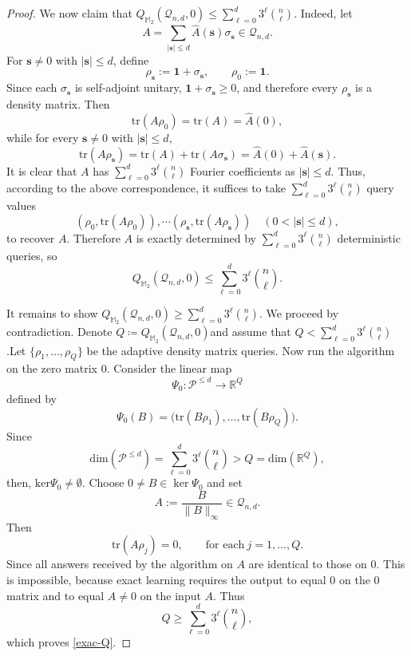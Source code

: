 \documentclass{amsbook}
\theoremstyle{definition}
\theoremstyle{remark}
\numberwithin{section}{chapter}
\numberwithin{equation}{chapter}
\newcommand{\M}{\mathbb{M}}
\newcommand{\1}{\mathbf{1}}
\newcommand{\s}{\mathbf{s}}
\begin{document}
\begin{proof}
We now claim that $Q_{\M_2}(\mathcal Q_{n,d},0)
\leq \sum_{\ell=0}^d 3^\ell \binom{n}{\ell}$. Indeed, let
	\[
	A=\sum_{|\s|\le d}\widehat A(\s)\sigma_{\s}\in \mathcal Q_{n,d}.
	\]	For $\s\neq 0$ with $|\s|\le d$, define
	\[
	\rho_{\s}:=\mathbf{1}+\sigma_{\s},
	\qquad
	\rho_0:=\mathbf{1}.
	\]
	Since each $\sigma_{\s}$ is  self-adjoint unitary, $\mathbf{1}+\sigma_{\s}\ge 0$, and therefore every
	$\rho_{\s}$ is a density matrix.
	Then
	\[
	\mathrm{tr}(A\rho_0)=\mathrm{tr}(A)=\widehat A(0),
	\]
	while for every $\s\neq 0$ with $|\s|\le d$,
	\[
	\mathrm{tr}(A\rho_{\s})
	=
	\mathrm{tr}(A)+\mathrm{tr}(A\sigma_{\s})
	=
	\widehat A(0)+\widehat A(\s).
	\]
It is clear that $A$ has $\sum_{\ell=0}^d 3^\ell \binom{n}{\ell}$ Fourier coefficients as $|\s|\leq d$. Thus, according to the above correspondence, it suffices to take $\sum_{\ell=0}^d 3^\ell \binom{n}{\ell}$ query values
	\[
(\rho_0,	\mathrm{tr}(A\rho_0)), \cdots
(\rho_{\s},	\mathrm{tr}(A\rho_{\s})) \quad (0< |\s|\le d),
	\]
to  recover $A$. 
	Therefore $A$ is exactly determined by $\sum_{\ell=0}^d 3^\ell \binom{n}{\ell}$ deterministic queries, so
	\[
	Q_{\M_2}(\mathcal Q_{n,d},0)\le \sum_{\ell=0}^d 3^\ell \binom{n}{\ell}.
	\]

It remains to show $Q_{\M_2}(\mathcal Q_{n,d},0)\geq \sum_{\ell=0}^d 3^\ell \binom{n}{\ell}$. We proceed by contradiction. Denote $Q\coloneqq Q_{\M_2}(\mathcal Q_{n,d},0)$and assume that $Q<\sum_{\ell=0}^d 3^\ell \binom{n}{\ell}$.Let $\{\rho_1,\dots,\rho_Q\}$ be the adaptive density matrix queries. Now run the algorithm on the zero matrix $0$. Consider the linear map
	\[
	\Psi_0:\mathcal P^{\leq d}\to \mathbb R^Q\]
	defined by
	\[
	\Psi_0(B)=
	\bigl(\mathrm{tr}(B\rho_1),\dots,\mathrm{tr}(B\rho_Q)\bigr).
	\]
	Since
	\[
\mathrm{dim}(\mathcal P^{\leq d})=\sum_{\ell=0}^d 3^\ell \binom{n}{\ell}>Q=\mathrm{dim}(\mathbb R^Q),
	\]
	then, $\mathrm{ker}\Psi_0\neq\emptyset$. Choose $0\neq B\in\ker\Psi_0$ and set
	\[
	A:=\frac{B}{\|B\|_\infty}\in \mathcal Q_{n,d}.
	\]
	Then
	\[
	\mathrm{tr}(A\rho_j)=0,\qquad \mbox{for each}\ j=1,\dots,Q.
	\]
	Since all answers received by the algorithm on $A$ are identical to those on \(0\).
	This is impossible, because exact learning requires the output to equal $0$ on the \(0\) matrix
	and to equal $A\neq 0$ on the input $A$.
	Thus
	\[
	Q\ge \sum_{\ell=0}^d 3^\ell \binom{n}{\ell},
	\]
which proves \eqref{exac-Q}.
	

\end{proof}
\end{document}
